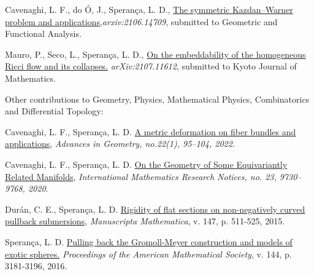 \documentclass[10pt]{article}
\newenvironment{innerlist}[1][\enskip\textbullet]%
{\begin{compactitem}[#1]}{\end{compactitem}}
\begin{document}
\begin{enumerate}
\begin{innerlist}[-]
			
			
			\item Cavenaghi, L. F., do Ó, J., Sperança, L. D., \href{https://arxiv.org/abs/2106.14709}{The symmetric Kazdan--Warner problem and applications},\textit{{arxiv:2106.14709}}, submitted to Geometric and Functional Analysis.
			
			
			
			
			\item  Mauro, P., Seco, L., Sperança, L. D., \href{https://arxiv.org/abs/2107.11612}{On the embeddability of the homogeneous Ricci flow and its collapses.} \textit{{arXiv:2107.11612}}, submitted to  Kyoto Journal of Mathematics.
			
			
			
		\end{innerlist}
		
		
		\item 
		Other contributions to Geometry, Physics, Mathematical Physics, Combinatorics and Differential Topology:
		
		
		\begin{innerlist}[-]
			\item Cavenaghi, L. F., Sperança, L. D. \href{https://doi.org/10.1515/advgeom-2021-0007}{A metric deformation on fiber bundles and applications},  \textit{Advances in Geometry, no.22(1), 95--104, 2022}.
			
			
			\item Cavenaghi, L. F., Sperança, L. D. \href{https://academic.oup.com/imrn/advance-article-abstract/doi/10.1093/imrn/rny268/5194089}{On the Geometry of Some Equivariantly Related Manifolds},  	\textit{ {International Mathematics Research Notices, no. 23, 9730–9768, 2020}}.
			
			
			
			\item Durán, C. E., Sperança, L. D. \href{https://link.springer.com/article/10.1007/s00229-015-0731-0}{Rigidity of flat sections on non-negatively curved pullback submersions}, {\textit{Manuscripta Mathematica}, v. 147, p. 511-525, 2015}.
			
			
			
			
			
			
			
			
			
			
			
			
			\item Sperança, L. D. \href{https://www.ams.org/journals/proc/2016-144-07/S0002-9939-2015-12945-0/home.html}{Pulling back the Gromoll-Meyer construction and models of exotic spheres.} {\textit{Proceedings of the American Mathematical Society}, v. 144, p. 3181-3196, 2016}.
			

\end{innerlist}
\end{enumerate}
\end{document}
